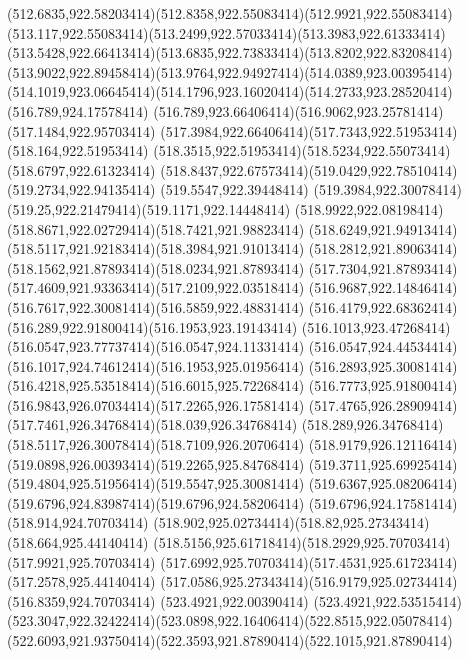 {{	\curveto(512.6835,922.58203414)(512.8358,922.55083414)(512.9921,922.55083414)
	\curveto(513.117,922.55083414)(513.2499,922.57033414)(513.3983,922.61333414)
	\curveto(513.5428,922.66413414)(513.6835,922.73833414)(513.8202,922.83208414)
	\curveto(513.9022,922.89458414)(513.9764,922.94927414)(514.0389,923.00395414)
	\curveto(514.1019,923.06645414)(514.1796,923.16020414)(514.2733,923.28520414)
	\closepath
	\moveto(516.789,924.17578414)
	\curveto(516.789,923.66406414)(516.9062,923.25781414)(517.1484,922.95703414)
	\curveto(517.3984,922.66406414)(517.7343,922.51953414)(518.164,922.51953414)
	\curveto(518.3515,922.51953414)(518.5234,922.55073414)(518.6797,922.61323414)
	\curveto(518.8437,922.67573414)(519.0429,922.78510414)(519.2734,922.94135414)
	\lineto(519.5547,922.39448414)
	\curveto(519.3984,922.30078414)(519.25,922.21479414)(519.1171,922.14448414)
	\curveto(518.9922,922.08198414)(518.8671,922.02729414)(518.7421,921.98823414)
	\curveto(518.6249,921.94913414)(518.5117,921.92183414)(518.3984,921.91013414)
	\curveto(518.2812,921.89063414)(518.1562,921.87893414)(518.0234,921.87893414)
	\curveto(517.7304,921.87893414)(517.4609,921.93363414)(517.2109,922.03518414)
	\curveto(516.9687,922.14846414)(516.7617,922.30081414)(516.5859,922.48831414)
	\curveto(516.4179,922.68362414)(516.289,922.91800414)(516.1953,923.19143414)
	\curveto(516.1013,923.47268414)(516.0547,923.77737414)(516.0547,924.11331414)
	\curveto(516.0547,924.44534414)(516.1017,924.74612414)(516.1953,925.01956414)
	\curveto(516.2893,925.30081414)(516.4218,925.53518414)(516.6015,925.72268414)
	\curveto(516.7773,925.91800414)(516.9843,926.07034414)(517.2265,926.17581414)
	\curveto(517.4765,926.28909414)(517.7461,926.34768414)(518.039,926.34768414)
	\curveto(518.289,926.34768414)(518.5117,926.30078414)(518.7109,926.20706414)
	\curveto(518.9179,926.12116414)(519.0898,926.00393414)(519.2265,925.84768414)
	\curveto(519.3711,925.69925414)(519.4804,925.51956414)(519.5547,925.30081414)
	\curveto(519.6367,925.08206414)(519.6796,924.83987414)(519.6796,924.58206414)
	\lineto(519.6796,924.17581414)
	\closepath
	\moveto(518.914,924.70703414)
	\curveto(518.902,925.02734414)(518.82,925.27343414)(518.664,925.44140414)
	\curveto(518.5156,925.61718414)(518.2929,925.70703414)(517.9921,925.70703414)
	\curveto(517.6992,925.70703414)(517.4531,925.61723414)(517.2578,925.44140414)
	\curveto(517.0586,925.27343414)(516.9179,925.02734414)(516.8359,924.70703414)
	\closepath
	\moveto(523.4921,922.00390414)
	\lineto(523.4921,922.53515414)
	\curveto(523.3047,922.32422414)(523.0898,922.16406414)(522.8515,922.05078414)
	\curveto(522.6093,921.93750414)(522.3593,921.87890414)(522.1015,921.87890414)
}}
